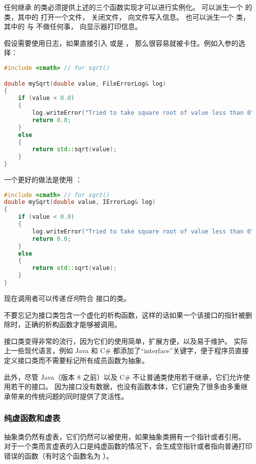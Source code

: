\documentclass[../../LearnCpp.tex]{subfiles}
\begin{document}
任何继承  的类必须提供上述的三个函数实现才可以进行实例化。
可以派生一个  的类，其中的  打开一个文件，
 关闭文件， 向文件写入信息。
也可以派生一个  类，其中的  与  不做任何事，
 向显示器打印信息。

假设需要使用日志，如果直接引入  或是 ，
那么很容易就被卡住。例如入参的选择：

\begin{lstlisting}[language=C++]
#include <cmath> // for sqrt()

double mySqrt(double value, FileErrorLog& log)
{
    if (value < 0.0)
    {
        log.writeError("Tried to take square root of value less than 0");
        return 0.0;
    }
    else
    {
        return std::sqrt(value);
    }
}
\end{lstlisting}

一个更好的做法是使用  ：

\begin{lstlisting}[language=C++]
#include <cmath> // for sqrt()
double mySqrt(double value, IErrorLog& log)
{
    if (value < 0.0)
    {
        log.writeError("Tried to take square root of value less than 0");
        return 0.0;
    }
    else
    {
        return std::sqrt(value);
    }
}
\end{lstlisting}

现在调用者可以传递\textit{任何}符合  接口的类。

不要忘记为接口类包含一个虚化的析构函数，这样的话如果一个该接口的指针被删除时，正确的析构函数才能够被调用。

接口类变得非常的流行，因为它们的使用简单，扩展方便，以及易于维护。
实际上一些现代语言，例如 Java 和 C\# 都添加了“interface”关键字，便于程序员直接定义接口类而不需要标记所有成员函数为抽象。

此外，尽管 Java（版本 8 之前）以及 C\# 不让普通类使用若干继承，它们允许使用若干的接口。
因为接口没有数据，也没有函数本体，它们避免了很多由多重继承带来的传统问题的同时提供了灵活性。

\subsubsection*{纯虚函数和虚表}

抽象类仍然有虚表，它们仍然可以被使用，如果抽象类拥有一个指针或者引用。
对于一个类而言虚表的入口是纯虚函数的情况下，会生成空指针或者指向普通打印错误的函数（有时这个函数名为  ）。
\end{document}
